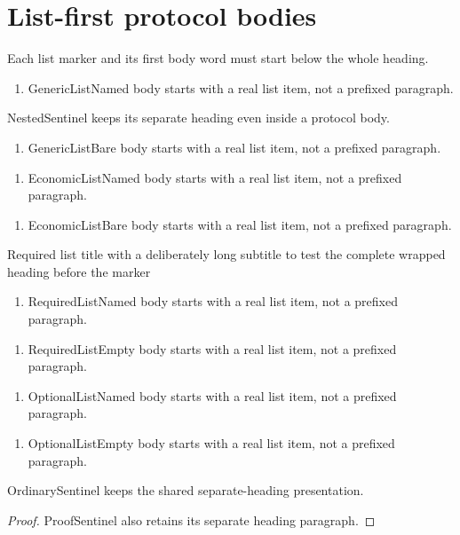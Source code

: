 \section{List-first protocol bodies}
Each list marker and its first body word must start below the whole heading.
\protocolsavestate
\newcommand{\protocolfirstlist}[2]{%
  \protocolbodyparagraph
  \begin{enumerate}[label={#1},leftmargin=3.4em,nosep]
    \item #2 body starts with a real list item, not a prefixed paragraph.
  \end{enumerate}}
\begin{protocol}\label{fixture:list-generic}
\protocolfirstlist{P1.}{GenericListNamed}
\begin{remark}[Nested]
NestedSentinel keeps its separate heading even inside a protocol body.
\end{remark}
\end{protocol}\protocolcheckstate
\begin{protocol}\label{fixture:list-generic-none}
\protocolfirstlist{P2.}{GenericListBare}
\end{protocol}\protocolcheckstate
\begin{heprotocol}\label{fixture:list-he}
\protocolfirstlist{H1.}{EconomicListNamed}
\end{heprotocol}\protocolcheckstate
\begin{heprotocol}\label{fixture:list-he-none}
\protocolfirstlist{H2.}{EconomicListBare}
\end{heprotocol}\protocolcheckstate
\begin{lsprotocol}{Required list title with a deliberately long subtitle to test the complete wrapped heading before the marker}
\label{fixture:list-ls}\protocolfirstlist{L1.}{RequiredListNamed}
\end{lsprotocol}\protocolcheckstate
\begin{lsprotocol}{}\label{fixture:list-ls-empty}
\protocolfirstlist{L2.}{RequiredListEmpty}
\end{lsprotocol}\protocolcheckstate
\begin{stpprotocol}\label{fixture:list-stp}
\protocolfirstlist{S1.}{OptionalListNamed}
\end{stpprotocol}\protocolcheckstate
\begin{stpprotocol}[]\label{fixture:list-stp-empty}
\protocolfirstlist{S2.}{OptionalListEmpty}
\end{stpprotocol}\protocolcheckstate
{}
\begin{theorem}[Unchanged]\label{fixture:list-restored}
OrdinarySentinel keeps the shared separate-heading presentation.
\end{theorem}
\begin{proof}[Proof]
ProofSentinel also retains its separate heading paragraph.
\end{proof}
\protocolcheckstate
\ifnum{}\relax\else
  \PackageError{protocol-fixture}{Protocol glyph leaked or disappeared}{Expected exactly 18.}\fi
{}
